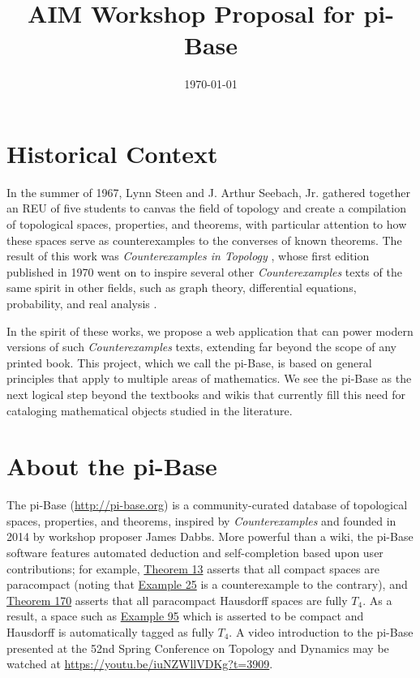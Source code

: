 \documentclass{amsart}
\title{AIM Workshop Proposal for pi-Base}
\date{\today}
\begin{document}
\maketitle


\section{Historical Context}

In the summer of 1967, Lynn Steen and J. Arthur Seebach, Jr. gathered together
an REU of five students to canvas the field of topology and create
a compilation of topological spaces, properties, and theorems, with particular
attention to how these spaces serve as counterexamples to the converses of
known theorems.
The result of this work was \textit{Counterexamples in Topology} 
\cite{MR1382863}, whose first edition published in 1970 
went on to inspire several other \textit{Counterexamples}
texts of the same spirit in other fields, such as graph theory, differential
equations, probability, and real analysis
\cite{MR0491272,MR1113487,MR930671,MR1256489}.

In the spirit of these works,
we propose a web application that can power modern versions
of such \textit{Counterexamples} texts, extending far beyond the scope
of any printed book. This project, which we call the pi-Base, is based 
on general principles that apply to multiple areas of mathematics.
We see the pi-Base as the next logical step beyond the textbooks
and wikis that currently fill this need for cataloging mathematical
objects studied in the literature.

\section{About the pi-Base}

The pi-Base (\url{http://pi-base.org}) is a community-curated
database of topological spaces, properties, and theorems, 
inspired by \textit{Counterexamples} and founded in 2014 by
workshop proposer James Dabbs. More
powerful than a wiki, the pi-Base software features automated
deduction and self-completion based upon user contributions;
for example,
\href{https://topology.pi-base.org/theorems/I000013}{Theorem 13}
asserts that all compact spaces are paracompact (noting
that \href{https://topology.pi-base.org/spaces/S000025}{Example 25}
is a counterexample to the contrary), and
\href{https://topology.pi-base.org/theorems/I000170}{Theorem 170}
asserts that all paracompact Hausdorff spaces are fully \(T_4\).
As a result, a space such as
\href{https://topology.pi-base.org/spaces/S000095}{Example 95}
which is asserted to be compact and Hausdorff is automatically tagged
as fully \(T_4\). A video introduction to the pi-Base presented at the
52nd Spring Conference on Topology and Dynamics may be
watched at \url{https://youtu.be/iuNZWllVDKg?t=3909}.
\end{document}
